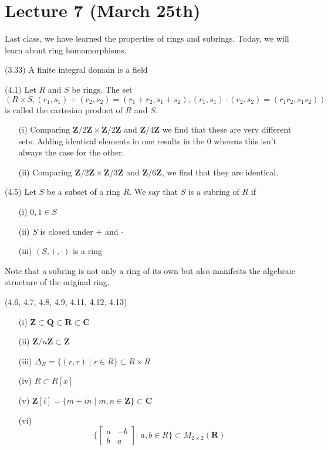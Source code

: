 \section{Lecture 7 (March 25th)}
Last class, we have learned the properties of rings and subrings. Today, we will learn about ring homomorphisms.
\\
\begin{prop}
 (3.33) A finite integral domain is a field
\end{prop}
\vspace{2ex}
\begin{defi}
 (4.1)
Let $R$ and $S$ be rings. The set
\[(R\times S,(r_1,s_1)+(r_2,s_2)=(r_1+r_2,s_1+s_2),(r_1,s_1)\cdot (r_2,s_2)=(r_1r_2,s_1s_2))\]
is called the cartesian product of $R$ and $S$.
\end{defi}
\vspace{2ex}
\begin{ex}
\begin{itemize}
	(4.2, 4.3)
	\item[(i)] Comparing ${\bm Z}/2{\bm Z}\times {\bm Z}/2{\bm Z}$ and ${\bm Z}/4{\bm Z}$ we find that these are very different sets. Adding identical elements in one results in the $0$ whereas this isn't always the case for the other.
	\item[(ii)] Comparing ${\bm Z}/2{\bm Z}\times {\bm Z}/3{\bm Z}$ and ${\bm Z}/6{\bm Z}$, we find that they are identical.
\end{itemize}
\end{ex}
\vspace{2ex}
\begin{defi}
 (4.5) Let $S$ be a subset of a ring $R$. We say that $S$ is a subring of $R$ if 
\begin{itemize}
	\item[(i)] $0,1\in S$
	\item[(ii)] $S$ is closed under $+$ and $\cdot $
	\item[(iii)] $(S,+,\cdot )$ is a ring
\end{itemize}
Note that a subring is not only a ring of its own but also manifests the algebraic structure of the original ring. 
\end{defi}
\vspace{2ex}
\begin{ex}
 (4.6, 4.7, 4.8, 4.9, 4.11, 4.12, 4.13)
\begin{itemize}
	\item[(i)] ${\bm Z}\subset {\bm Q}\subset {\bm R}\subset {\bm C}$
	\item[(ii)] ${\bm Z}/n{\bm Z}\subset {\bm Z}$
	\item[(iii)] $\Delta_{R}=\{(r,r) \;|\; r\in R\}\subset R\times R$
	\item[(iv)] $R\subset R[x]$
	\item[(v)] ${\bm Z}[i]=\{m+in \;|\; m,n\in {\bm Z}\}\subset {\bm C}$
	\item[(vi)] 
	\[\Big\{\begin{bmatrix}
			a&-b\\b&a
	\end{bmatrix}\Big|\;a,b\in R
	\Big\}\subset M_{2\times 2}({\bm R})\]
\end{itemize}
\end{ex}
